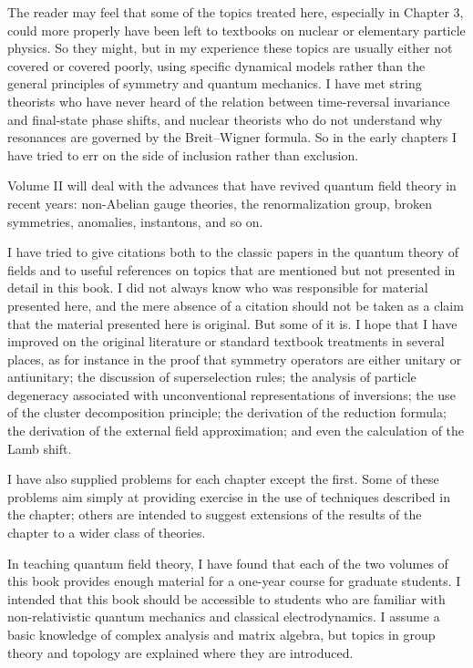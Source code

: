 The reader may feel that some of the topics treated here, especially in Chapter
3, could more properly have been left to textbooks on nuclear or elementary
particle physics. So they might, but in my experience these topics are usually
either not covered or covered poorly, using specific dynamical models rather
than the general principles of symmetry and quantum mechanics. I have met
string theorists who have never heard of the relation between time-reversal
invariance and final-state phase shifts, and nuclear theorists who do not
understand why resonances are governed by the Breit--Wigner formula. So in the
early chapters I have tried to err on the side of inclusion rather than
exclusion.

Volume II will deal with the advances that have revived quantum field theory in
recent years: non-Abelian gauge theories, the renormalization group, broken
symmetries, anomalies, instantons, and so on.

I have tried to give citations both to the classic papers in the quantum theory
of fields and to useful references on topics that are mentioned but not
presented in detail in this book. I did not always know who was responsible for
material presented here, and the mere absence of a citation should not be taken
as a claim that the material presented here is original. But some of it is. I
hope that I have improved on the original literature or standard textbook
treatments in several places, as for instance in the proof that symmetry
operators are either unitary or antiunitary; the discussion of superselection
rules; the analysis of particle degeneracy associated with unconventional
representations of inversions; the use of the cluster decomposition principle;
the derivation of the reduction formula; the derivation of the external field
approximation; and even the calculation of the Lamb shift.

I have also supplied problems for each chapter except the first. Some of these
problems aim simply at providing exercise in the use of techniques described in
the chapter; others are intended to suggest extensions of the results of the
chapter to a wider class of theories.

In teaching quantum field theory, I have found that each of the two volumes of
this book provides enough material for a one-year course for graduate students.
I intended that this book should be accessible to students who are familiar
with non-relativistic quantum mechanics and classical electrodynamics. I assume
a basic knowledge of complex analysis and matrix algebra, but topics in group
theory and topology are explained where they are introduced.

